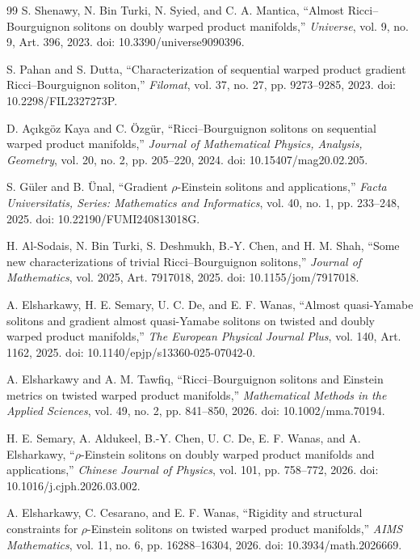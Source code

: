 \documentclass[a4paper,11pt]{article}
\theoremstyle{plain}
\numberwithin{equation}{section}
\begin{document}
\begin{thebibliography}{99}
	S. Shenawy, N. Bin Turki, N. Syied, and C. A. Mantica,
	``Almost Ricci--Bourguignon solitons on doubly warped product
	manifolds,''
	\emph{Universe},
	vol. 9, no. 9, Art. 396, 2023.
	doi: 10.3390/universe9090396.
	
	S. Pahan and S. Dutta,
	``Characterization of sequential warped product gradient
	Ricci--Bourguignon soliton,''
	\emph{Filomat},
	vol. 37, no. 27, pp. 9273--9285, 2023.
	doi: 10.2298/FIL2327273P.
	
	D. A\c{c}{\i}kg\"{o}z Kaya and C. \"{O}zg\"{u}r,
	``Ricci--Bourguignon solitons on sequential warped product
	manifolds,''
	\emph{Journal of Mathematical Physics, Analysis, Geometry},
	vol. 20, no. 2, pp. 205--220, 2024.
	doi: 10.15407/mag20.02.205.
	
	S. G\"{u}ler and B. \"{U}nal,
	``Gradient $\rho$-Einstein solitons and applications,''
	\emph{Facta Universitatis, Series: Mathematics and Informatics},
	vol. 40, no. 1, pp. 233--248, 2025.
	doi: 10.22190/FUMI240813018G.
	
	H. Al-Sodais, N. Bin Turki, S. Deshmukh, B.-Y. Chen,
	and H. M. Shah,
	``Some new characterizations of trivial Ricci--Bourguignon solitons,''
	\emph{Journal of Mathematics},
	vol. 2025, Art. 7917018, 2025.
	doi: 10.1155/jom/7917018.
	
	A. Elsharkawy, H. E. Semary, U. C. De, and E. F. Wanas,
	``Almost quasi-Yamabe solitons and gradient almost quasi-Yamabe
	solitons on twisted and doubly warped product manifolds,''
	\emph{The European Physical Journal Plus},
	vol. 140, Art. 1162, 2025.
	doi: 10.1140/epjp/s13360-025-07042-0.
	
	A. Elsharkawy and A. M. Tawfiq,
	``Ricci--Bourguignon solitons and Einstein metrics on twisted warped
	product manifolds,''
	\emph{Mathematical Methods in the Applied Sciences},
	vol. 49, no. 2, pp. 841--850, 2026.
	doi: 10.1002/mma.70194.
	
	H. E. Semary, A. Aldukeel, B.-Y. Chen, U. C. De,
	E. F. Wanas, and A. Elsharkawy,
	``$\rho$-Einstein solitons on doubly warped product manifolds and
	applications,''
	\emph{Chinese Journal of Physics},
	vol. 101, pp. 758--772, 2026.
	doi: 10.1016/j.cjph.2026.03.002.
	
	A. Elsharkawy, C. Cesarano, and E. F. Wanas,
	``Rigidity and structural constraints for $\rho$-Einstein solitons
	on twisted warped product manifolds,''
	\emph{AIMS Mathematics},
	vol. 11, no. 6, pp. 16288--16304, 2026.
	doi: 10.3934/math.2026669.
	
\end{thebibliography}

	

\vspace{5mm}
\vspace{2mm}
	
\end{document}
